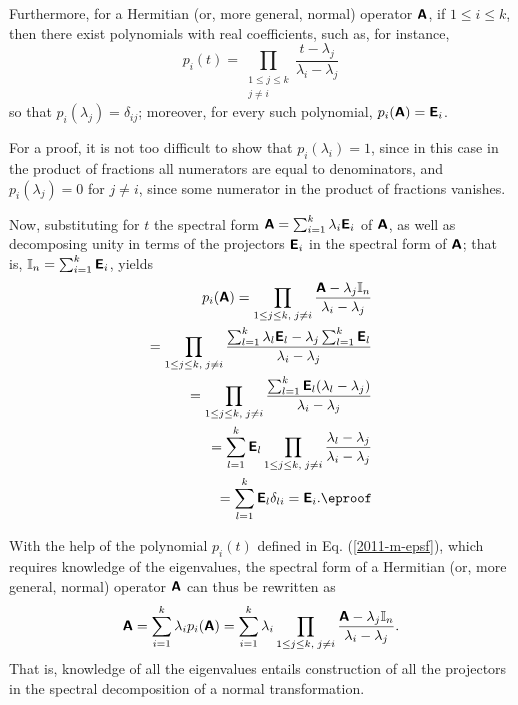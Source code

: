 Furthermore, for a  Hermitian (or, more general, normal) operator $\textsf{\textbf{A}}$,
if $1\le i \le k$,
then there exist polynomials with real coefficients, such as,  for instance,
\begin{equation}
p_i  (t)
=
\prod_{
\begin{array}{c}
1\le j\le k\\
j\neq i
\end{array}
}
\frac{t-\lambda_j}{\lambda_i -\lambda_j}
\label{2011-m-epsf}
\end{equation}
so that
$p_i(\lambda_j) =\delta_{ij}$;
moreover, for every such polynomial,
$p_i(\textsf{\textbf{A}})=\textsf{\textbf{E}}_i$.

{\color{OliveGreen}\bproof

For a proof, it is not too difficult
to show that
$p_i  (\lambda_i)=1$, since in this case in the product of fractions all numerators are equal to denominators,
and
$p_i  (\lambda_j)=0$ for $j\neq i $, since some numerator in the product of fractions vanishes.

Now, substituting for $t$ the spectral form $\textsf{\textbf{A}}=\sum_{i=1}^k \lambda_i\textsf{\textbf{E}}_i$
of $\textsf{\textbf{A}}$, as well as
decomposing unity in terms of the projectors $\textsf{\textbf{E}}_i$ in the spectral form of
$\textsf{\textbf{A}}$; that is, ${\Bbb I}_n=\sum_{i=1}^k \textsf{\textbf{E}}_i$,
yields
\begin{equation}
\begin{split}
p_i  (\textsf{\textbf{A}})
=
\prod_{
1\le j\le k,\;
j\neq i
}\frac{\textsf{\textbf{A}} - \lambda_j{\Bbb I}_n}{\lambda_i -\lambda_j}  \\
=
\prod_{
1\le j\le k,\;
j\neq i
}\frac{\sum_{l=1}^k \lambda_l\textsf{\textbf{E}}_l - \lambda_j\sum_{l=1}^k \textsf{\textbf{E}}_l}{\lambda_i -\lambda_j}  \\
=
\prod_{
1\le j\le k,\;
j\neq i
}\frac{\sum_{l=1}^k \textsf{\textbf{E}}_l(\lambda_l- \lambda_j)}{\lambda_i -\lambda_j}  \\
= \sum_{l=1}^k \textsf{\textbf{E}}_l
\prod_{
1\le j\le k,\;
j\neq i
}\frac{\lambda_l- \lambda_j}{\lambda_i -\lambda_j}  \\
= \sum_{l=1}^k \textsf{\textbf{E}}_l
\delta_{li} = \textsf{\textbf{E}}_i.
\eproof
\end{split}
\label{2012-m-ch-fdvs-cc}
\end{equation}
}

With the help of the polynomial $p_i(t)$ defined in Eq. (\ref{2011-m-epsf}),
which requires knowledge of the eigenvalues,
the spectral form of a Hermitian (or, more general, normal) operator  $\textsf{\textbf{A}}$ can thus be rewritten as
\begin{equation}
\textsf{\textbf{A}}=\sum_{i=1}^k \lambda_i p_i(\textsf{\textbf{A}})=  \sum_{i=1}^k \lambda_i \prod_{
1\le j\le k,\;
j\neq i
}\frac{\textsf{\textbf{A}} - \lambda_j{\Bbb I}_n}{\lambda_i -\lambda_j}.
\end{equation}
That is, knowledge of all the eigenvalues entails construction
of all the projectors in the spectral decomposition
of a normal transformation.





